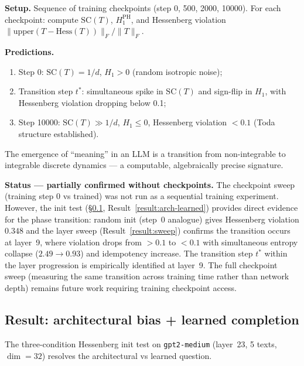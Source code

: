 \documentclass[11pt]{amsart}
\theoremstyle{definition}
\begin{document}
\textbf{Setup.}
Sequence of training checkpoints (step 0, 500, 2000, 10000).
For each checkpoint: compute $\mathrm{SC}(T)$, $H_1^{\mathrm{PH}}$,
and Hessenberg violation $\|\mathrm{upper}(T-\mathrm{Hess}(T))\|_F/\|T\|_F$.

\textbf{Predictions.}
\begin{enumerate}
  \item Step 0: $\mathrm{SC}(T) = 1/d$, $H_1 > 0$ (random isotropic noise);
  \item Transition step $t^*$: simultaneous spike in $\mathrm{SC}(T)$
    and sign-flip in $H_1$, with Hessenberg violation dropping below 0.1;
  \item Step 10000: $\mathrm{SC}(T) \gg 1/d$, $H_1 \leq 0$,
    Hessenberg violation $< 0.1$ (Toda structure established).
\end{enumerate}
The emergence of ``meaning'' in an LLM is a transition from
non-integrable to integrable discrete dynamics --- a computable,
algebraically precise signature.

\textbf{Status — partially confirmed without checkpoints.}
The checkpoint sweep (training step 0 vs trained) was not run
as a sequential training experiment.
However, the init test (§\ref{sec:arch-vs-learned}, Result~\ref{result:arch-learned})
provides direct evidence for the phase transition:
random init (step~0 analogue) gives Hessenberg violation $0.348$
and the layer sweep (Result~\ref{result:sweep}) confirms the
transition occurs at layer~9, where violation drops from $>0.1$ to $<0.1$
with simultaneous entropy collapse ($2.49 \to 0.93$) and idempotency increase.
The transition step $t^*$ within the layer progression is empirically
identified at layer~9.
The full checkpoint sweep (measuring the same transition across training
time rather than network depth) remains future work requiring
training checkpoint access.

\subsection{Result: architectural bias + learned completion}
\label{sec:arch-vs-learned}

The three-condition Hessenberg init test on \texttt{gpt2-medium}
(layer~23, 5 texts, $\dim=32$) resolves the architectural vs learned question.
\end{document}
